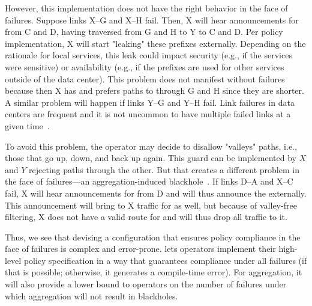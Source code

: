 However, this implementation does not have the right behavior in the face of failures. Suppose links X--G and X--H fail. Then, X will hear announcements for  from C and D, having traversed from G and H to Y to C and D. Per policy implementation, X will start "leaking" these prefixes externally. Depending on the rationale for local services, this leak could impact security (e.g., if the services were sensitive) or availability (e.g., if the  prefixes are used for other services outside of the data center). This problem does not manifest without failures because then X has and prefers paths to  through G and H since they are shorter. A similar problem will happen if links Y--G and Y--H fail.
Link failures in data centers are frequent and it is not uncommon to have multiple failed links at a given time~\cite{dc-failure-study}.

To avoid this problem, the operator may decide to disallow "valleys" paths, i.e., those that go up, down, and back up again. This guard can be implemented by $X$ and $Y$ rejecting paths through the other. But that creates a different problem in the face of failures---an aggregation-induced blackhole~\cite{xx}. If links D--A and X--C fail, X will hear announcements for  from D and will thus announce the  externally. This announcement will bring to X traffic for  as well, but because of valley-free filtering, X does not have a valid route for  and will thus drop all traffic to it.

Thus, we see that devising a configuration that ensures policy compliance in the face of failures is complex and error-prone. \sysname lets operators implement their high-level policy specification in a way that guarantees compliance under all failures (if that is possible; otherwise, it generates a compile-time error). For aggregation, it will also provide a lower bound to operators on the number of failures under which aggregation will not result in blackholes.



